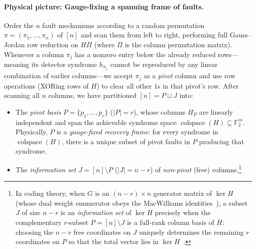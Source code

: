 \documentclass[12pt]{article}
\theoremstyle{definition}
\newcommand{\Ftwo}{\mathbb{F}_2}
\begin{document}
\paragraph{Physical picture: Gauge-fixing a spanning frame of faults.}
Order the $n$ fault mechanisms according to a random permutation $\pi = (\pi_1, \dots, \pi_n)$ of $[n]$ and scan
them from left to right, performing full Gauss--Jordan row reduction on $H \Pi$ (where $\Pi$ is the column
permutation matrix). Whenever a column $\pi_j$ has a nonzero entry below the already reduced rows---meaning its
detector syndrome $h_{\pi_j}$ cannot be reproduced by any linear combination of earlier columns---we accept $\pi_j$
as a \emph{pivot} column and use row operations (XORing rows of $H$) to clear all other $1$s in that pivot's row.
After scanning all $n$ columns, we have partitioned $[n] = P \sqcup J$ into:
\begin{itemize}
  \item The \emph{pivot basis} $P = \{p_1, \dots, p_r\}$ ($|P| = r$), whose columns $H_P$ are linearly independent
    and span the achievable syndrome space $\operatorname{colspace}(H) \subseteq \Ftwo^m$. Physically, $P$ is a
    \emph{gauge-fixed recovery frame}: for every syndrome in $\operatorname{colspace}(H)$, there is a unique subset
    of pivot faults in $P$ producing that syndrome.
  \item The \emph{information set} $J = [n] \setminus P$ ($|J| = n - r$) of \emph{non-pivot} (free)
    columns.\footnote{In coding theory, when $G$ is an $(n-r) \times n$ generator matrix of $\ker H$ (whose dual
    weight enumerator obeys the MacWilliams identities~\cite{MacWilliams1963}), a subset $J$ of size $n - r$ is an
    \emph{information set} of $\ker H$ precisely when the complementary $r$-subset $P = [n] \setminus J$ is a
    full-rank column basis of $H$: choosing the $n - r$ free coordinates on $J$ uniquely determines the remaining
    $r$ coordinates on $P$ so that the total vector lies in $\ker H$~\cite{Prange1962,MacWilliamsSloane1977}.}
\end{itemize}
\end{document}
